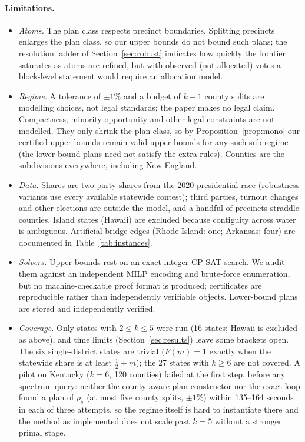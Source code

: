 \paragraph{Limitations.}
\begin{itemize}[leftmargin=*]
\item \emph{Atoms.} The plan class respects precinct boundaries. Splitting precincts enlarges the plan class, so our upper bounds do not bound such plans; the resolution ladder of Section~\ref{sec:robust} indicates how quickly the frontier saturates as atoms are refined, but with observed (not allocated) votes a block-level statement would require an allocation model.
\item \emph{Regime.} A tolerance of $\pm1\%$ and a budget of $k-1$ county splits are modelling choices, not legal standards; the paper makes no legal claim. Compactness, minority-opportunity and other legal constraints are not modelled. They only shrink the plan class, so by Proposition~\ref{prop:mono} our certified upper bounds remain valid upper bounds for any such sub-regime (the lower-bound plans need not satisfy the extra rules). Counties are the subdivisions everywhere, including New England.
\item \emph{Data.} Shares are two-party shares from the 2020 presidential race (robustness variants use every available statewide contest); third parties, turnout changes and other elections are outside the model, and a handful of precincts straddle counties. Island states (Hawaii) are excluded because contiguity across water is ambiguous. Artificial bridge edges (Rhode Island: one; Arkansas: four) are documented in Table~\ref{tab:instances}.
\item \emph{Solvers.} Upper bounds rest on an exact-integer CP-SAT search. We audit them against an independent MILP encoding and brute-force enumeration, but no machine-checkable proof format is produced; certificates are reproducible rather than independently verifiable objects. Lower-bound plans are stored and independently verified.
\item \emph{Coverage.} Only states with $2\le k\le5$ were run (16 states; Hawaii is excluded as above), and time limits (Section~\ref{sec:results}) leave some brackets open. The six single-district states are trivial ($F(m)=1$ exactly when the statewide share is at least $\tfrac12+m$); the 27 states with $k\ge6$ are not covered. A pilot on Kentucky ($k=6$, 120 counties) failed at the first step, before any spectrum query: neither the county-aware plan constructor nor the exact loop found a plan of $\rho_s$ (at most five county splits, $\pm1\%$) within 135--164 seconds in each of three attempts, so the regime itself is hard to instantiate there and the method as implemented does not scale past $k=5$ without a stronger primal stage.
\end{itemize}

